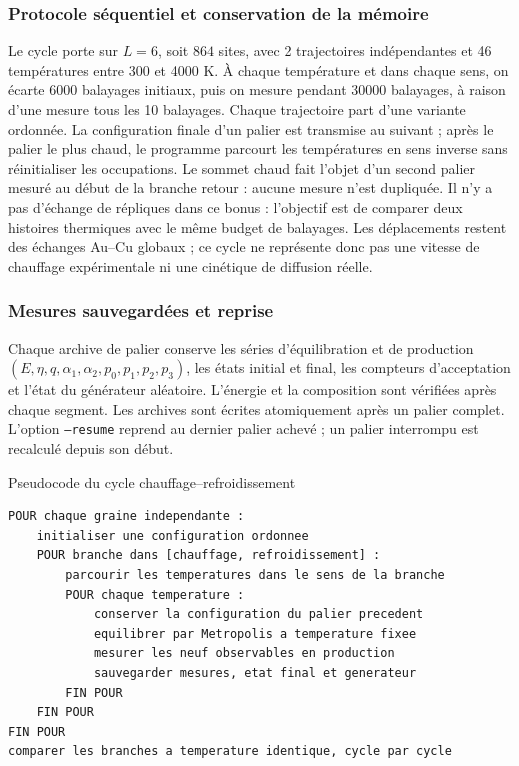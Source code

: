 \subsubsection{Protocole séquentiel et conservation de la mémoire}
Le cycle porte sur $L=6$, soit $864$ sites, avec 2 trajectoires indépendantes et 46 températures entre 300 et 4000 K.
À chaque température et dans chaque sens, on écarte 6000 balayages initiaux, puis on mesure pendant 30000 balayages, à raison d'une mesure tous les 10 balayages.
Chaque trajectoire part d'une variante ordonnée. La configuration finale d'un palier est transmise au suivant ; après le palier le plus chaud, le programme parcourt les températures en sens inverse sans réinitialiser les occupations. Le sommet chaud fait l'objet d'un second palier mesuré au début de la branche retour : aucune mesure n'est dupliquée.
Il n'y a pas d'échange de répliques dans ce bonus : l'objectif est de comparer deux histoires thermiques avec le même budget de balayages. Les déplacements restent des échanges Au--Cu globaux ; ce cycle ne représente donc pas une vitesse de chauffage expérimentale ni une cinétique de diffusion réelle.
\subsubsection{Mesures sauvegardées et reprise}
Chaque archive de palier conserve les séries d'équilibration et de production $(E,\eta,q,\alpha_1,\alpha_2,p_0,p_1,p_2,p_3)$, les états initial et final, les compteurs d'acceptation et l'état du générateur aléatoire. L'énergie et la composition sont vérifiées après chaque segment. Les archives sont écrites atomiquement après un palier complet. L'option \texttt{--resume} reprend au dernier palier achevé ; un palier interrompu est recalculé depuis son début.
\par
\begin{algocode}{Pseudocode du cycle chauffage--refroidissement}
\small\begin{verbatim}
POUR chaque graine independante :
    initialiser une configuration ordonnee
    POUR branche dans [chauffage, refroidissement] :
        parcourir les temperatures dans le sens de la branche
        POUR chaque temperature :
            conserver la configuration du palier precedent
            equilibrer par Metropolis a temperature fixee
            mesurer les neuf observables en production
            sauvegarder mesures, etat final et generateur
        FIN POUR
    FIN POUR
FIN POUR
comparer les branches a temperature identique, cycle par cycle
\end{verbatim}
\end{algocode}
